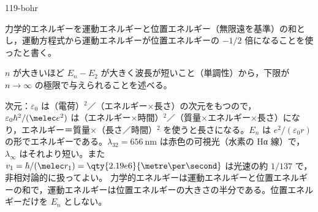 \documentclass[uplatex,dvipdfmx,a4paper,11pt]{jsarticle}
\begin{document}
\begin{kaisetsu}{119-bohr}
{}
\begin{ronten}
  \item {} 力学的エネルギーを運動エネルギーと位置エネルギー（無限遠を基準）の和とし，運動方程式から運動エネルギーが位置エネルギーの $-1/2$ 倍になることを使ったと書く。
  \item {} $n$ が大きいほど $E_{n}-E_{2}$ が大きく波長が短いこと（単調性）から，下限が $n\to\infty$ の極限で与えられることを述べる。
\end{ronten}
\kenzan 次元：$\varepsilon_{0}$ は（電荷）$^{2}$／（エネルギー×長さ）の次元をもつので，$\varepsilon_{0}\hbar^{2}/(\melec e^{2})$ は（エネルギー×時間）$^{2}$／（質量×エネルギー×長さ）になり，エネルギー＝質量×（長さ／時間）$^{2}$ を使うと長さになる。$E_{n}$ は $e^{2}/(\varepsilon_{0}r)$ の形でエネルギーである。$\lambda_{32}=\qty{656}{\nano\metre}$ は赤色の可視光（水素の Hα 線）で，$\lambda_{\infty}$ はそれより短い。また $v_{1}=\hbar/(\melec r_{1})=\qty{2.19e6}{\metre\per\second}$ は光速の約 $1/137$ で，非相対論的に扱ってよい。
\tsumazuki 力学的エネルギーは運動エネルギーと位置エネルギーの和で，運動エネルギーは位置エネルギーの大きさの半分である。位置エネルギーだけを $E_{n}$ としない。
\end{kaisetsu}
\end{document}
